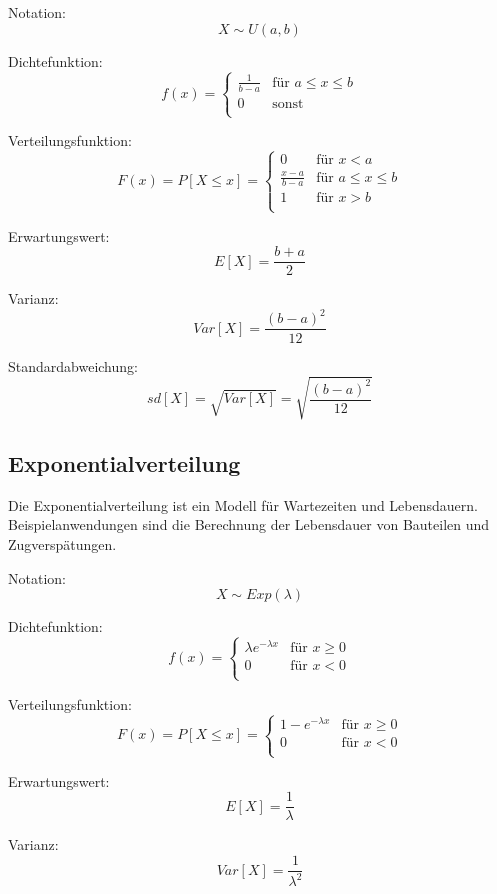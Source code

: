 \documentclass[10pt,a4paper,twocolumn]{article}
\begin{document}
\vspace{10pt}

Notation:
\[
X \sim U(a,b)
\]

Dichtefunktion:
\[
f(x)=
\begin{cases}
	\frac{1}{b-a} & \text{für $a \leq x \leq b$} \\
	0 & \text{sonst} \\
\end{cases} 
\]

Verteilungsfunktion:
\[
F(x)=P[X \leq x]=
\begin{cases}
	0 & \text{für $x < a$} \\	
	\frac{x-a}{b-a} & \text{für $a \leq x \leq b$} \\
	1 & \text{für $x > b$} \\
\end{cases} 
\]

Erwartungswert:
\[
E[X]=\frac{b+a}{2}
\]

Varianz:
\[
Var[X]=\frac{(b-a)^2}{12}
\]

Standardabweichung:
\[
sd[X]=\sqrt{Var[X]}=\sqrt{\frac{(b-a)^2}{12}}
\]

\subsection{Exponentialverteilung}
Die Exponentialverteilung ist ein Modell für Wartezeiten und Lebensdauern. Beispielanwendungen sind die Berechnung der Lebensdauer von Bauteilen und Zugverspätungen.

\vspace{10pt}

Notation:
\[
X \sim Exp(\lambda)
\]

Dichtefunktion:
\[
f(x)=
\begin{cases}
	\lambda e^{- \lambda x} & \text{für $x \geq 0$} \\
	0 & \text{für $x < 0$} \\
\end{cases} 
\]

Verteilungsfunktion:
\[
F(x)=P[X \leq x]=
\begin{cases}
	1-e^{- \lambda x} & \text{für $x \geq 0$} \\	
	0 & \text{für $x < 0$} \\
\end{cases} 
\]

Erwartungswert:
\[
E[X]=\frac{1}{\lambda}
\]

Varianz:
\[
Var[X]=\frac{1}{\lambda^{2}}
\]
\end{document}
